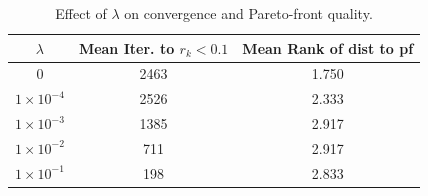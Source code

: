 \documentclass[sigconf]{acmart}
\begin{document}
\begin{table}[t]
\centering
\caption{Effect of $\lambda$ on convergence and Pareto-front quality.}\label{table10}
\begin{tabular}{c c c}
\toprule
$\lambda$ & Mean Iter. to $r_k < 0.1$ & Mean Rank of dist to pf \\
\midrule
0      & 2463 & 1.750 \\
$1\times10^{-4}$ & 2526 & 2.333 \\
$1\times10^{-3}$ & 1385 & 2.917 \\
$1\times10^{-2}$ & 711  & 2.917 \\
$1\times10^{-1}$ & 198  & 2.833 \\
\bottomrule
\end{tabular}
\end{table}

\begin{table}[t]
\centering
\caption{Effect of different $\lambda$ values on convergence speed and distance to the Pareto front for problem F11.}
\label{tab:f11_lambda}
\end{table}
\end{document}
